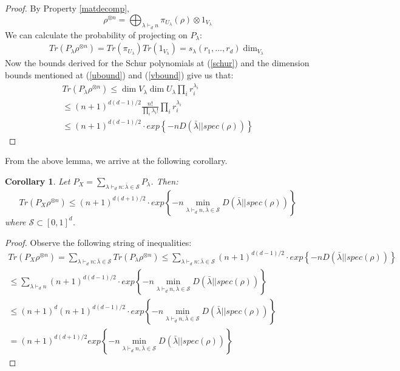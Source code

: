 \documentclass[12pt]{article}%
\newtheorem{coro}{Corollary}
\begin{document}
\begin{proof}
 By Property \ref{matdecomp},
 $$ \rho^{\otimes n} = \bigoplus_{\lambda \vdash_d n} \pi_{U_\lambda}(\rho) \otimes 1_{V_\lambda}$$
 We can calculate the probability of projecting on $P_{\lambda}$:
 \begin{gather*}
   Tr(P_\lambda\rho^{\otimes n}) = Tr(\pi_{U_\lambda})Tr(1_{V_\lambda}) = s_{\lambda}(r_1,...,r_d)\dim_{V_\lambda}
 \end{gather*}
  Now the bounds derived for the Schur polynomials at (\ref{schur}) and the dimension bounds mentioned at (\ref{ubound}) and (\ref{vbound}) give us that:
  \begin{gather*}
    Tr(P_\lambda\rho^{\otimes n}) \leq \dim{V_\lambda}\dim{U_\lambda} \prod_{i} r_i^{\lambda_i} \\
    \leq (n+1)^{d(d-1)/2}\frac{n!}{\prod_i \lambda_i!} \prod_{i} r_i^{\lambda_i} \\
    \leq (n+1)^{d(d-1)/2}\cdot exp\left\{{-n D(\bar{\lambda}||spec(\rho))}\right\}
  \end{gather*}
\end{proof}

\noindent From the above lemma, we arrive at the following corollary.

\begin{coro}
  Let $P_X = \sum_{\lambda \vdash_d n: \bar{\lambda} \in \mathcal{S}} P_\lambda$. Then:
  $$ Tr(P_X\rho^{\otimes n}) \leq (n+1)^{d(d+1)/2} \cdot exp\left\{-n \min_{\lambda \vdash_d n, \bar{\lambda} \in \mathcal{S}}{D(\bar{\lambda}||spec(\rho))} \right\}$$
where $\mathcal{S} \subset [0,1]^d$.
\end{coro}

\begin{proof}
Observe the following string of inequalities:
  \begin{gather*}
      Tr(P_X\rho^{\otimes n}) = \sum_{\lambda \vdash_d n: \bar{\lambda} \in \mathcal{S}} Tr(P_\lambda\rho^{\otimes n}) \leq \sum_{\lambda \vdash_d n: \bar{\lambda} \in \mathcal{S}} (n+1)^{d(d-1)/2} \cdot exp \left\{ -n D(\bar{\lambda}||spec(\rho)) \right\} \\
      \leq
            \sum_{\lambda \vdash_d n} (n+1)^{d(d-1)/2} \cdot exp \left\{ -n \min_{\lambda \vdash_d n, \bar{\lambda} \in \mathcal{S}} D(\bar{\lambda}||spec(\rho)) \right\} \\
      \leq (n+1)^d  (n+1)^{d(d-1)/2} \cdot exp \left\{ -n \min_{\lambda \vdash_d n, \bar{\lambda} \in \mathcal{S}} D(\bar{\lambda}||spec(\rho)) \right\} \\
      = (n+1)^{d(d+1)/2} exp\left\{-n \min_{\lambda \vdash_d n, \bar{\lambda} \in \mathcal{S}}{D(\bar{\lambda}||spec(\rho))} \right\}
  \end{gather*}
\end{proof}
\end{document}
